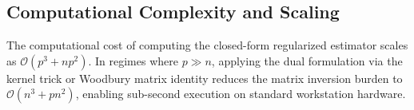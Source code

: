 \subsection{Computational Complexity and Scaling}
The computational cost of computing the closed-form regularized estimator scales as $\mathcal{O}(p^3 + np^2)$. In regimes where $p \gg n$, applying the dual formulation via the kernel trick or Woodbury matrix identity reduces the matrix inversion burden to $\mathcal{O}(n^3 + pn^2)$, enabling sub-second execution on standard workstation hardware.
